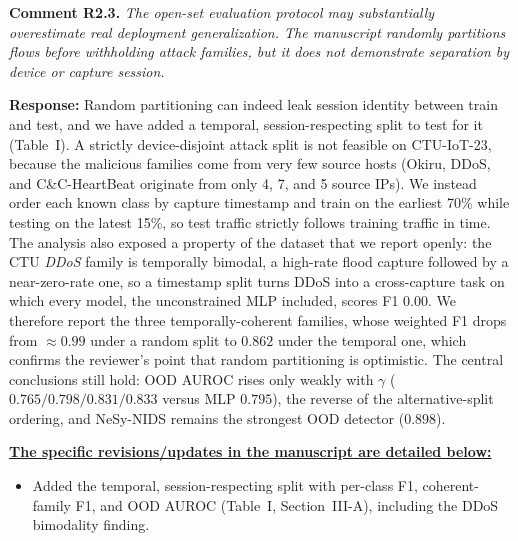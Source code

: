 \documentclass[11pt]{article}
\newcommand{\cmt}[2]{\medskip\noindent\textbf{Comment #1.} \textit{#2}\par}
\newcommand{\resp}{\smallskip\par\noindent\textbf{Response:} }
\newcommand{\revs}{\smallskip\par\noindent\underline{\textbf{The specific revisions/updates in the manuscript are detailed below:}}\par}
\begin{document}
\cmt{R2.3}{The open-set evaluation protocol may substantially overestimate real
deployment generalization. The manuscript randomly partitions flows before
withholding attack families, but it does not demonstrate separation by device or
capture session.}
\resp Random partitioning can indeed leak session identity between train and test,
and we have added a temporal, session-respecting split to test for it (Table~I). A
strictly device-disjoint attack split is not feasible on CTU-IoT-23, because the
malicious families come from very few source hosts (Okiru, DDoS, and
C\&C-HeartBeat originate from only 4, 7, and 5 source IPs). We instead order each
known class by capture timestamp and train on the earliest 70\% while testing on
the latest 15\%, so test traffic strictly follows training traffic in time. The
analysis also exposed a property of the dataset that we report openly: the CTU
\emph{DDoS} family is temporally bimodal, a high-rate flood capture followed by a
near-zero-rate one, so a timestamp split turns DDoS into a cross-capture task on
which every model, the unconstrained MLP included, scores F1 $0.00$. We therefore
report the three temporally-coherent families, whose weighted F1 drops from
${\approx}0.99$ under a random split to $0.862$ under the temporal one, which
confirms the reviewer's point that random partitioning is optimistic. The central
conclusions still hold: OOD AUROC rises only weakly with $\gamma$
($0.765/0.798/0.831/0.833$ versus MLP $0.795$), the reverse of the alternative-split
ordering, and NeSy-NIDS remains the strongest OOD detector ($0.898$).
\revs
\begin{itemize}
  \item Added the temporal, session-respecting split with per-class F1,
  coherent-family F1, and OOD AUROC (Table~I, Section~III-A), including the DDoS
  bimodality finding.
\end{itemize}
\end{document}
